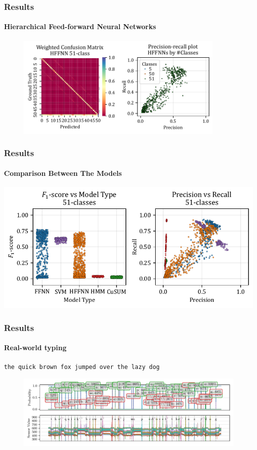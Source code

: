 \documentclass[xcolor={svgnames,table},10pt,fleqn]{beamer}
\begin{document}
\begin{frame}
    \frametitle{Results}
    \framesubtitle{Hierarchical Feed-forward Neural Networks}
    \begin{figure}[h]
        \centering
        \includegraphics[width=0.9\textwidth]{imgs/05_mean_conf_mat_hffnn.pdf}
    \end{figure}
\end{frame}

\begin{frame}
    \frametitle{Results}
    \framesubtitle{Comparison Between The Models}
    \includegraphics[width=\textwidth]{imgs/05_precision_recall_51_classes.pdf}
\end{frame}

\begin{frame}
    \frametitle{Results}
    \framesubtitle{Real-world typing}
    \centering
    \texttt{the quick brown fox jumped over the lazy dog}
    \begin{figure}[h]
        \centering
        \includegraphics[width=\textwidth]{imgs/05_pred_plot_0000_to_9420_full_text.pdf}
    \end{figure}
\end{frame}
\end{document}
